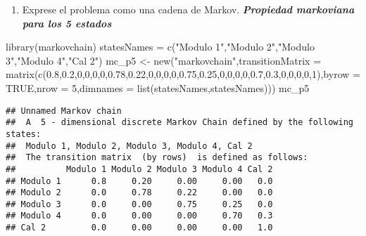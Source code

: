 \documentclass[
]{article}
\newenvironment{Shaded}{\begin{snugshade}}{\end{snugshade}}
\newcommand{\AttributeTok}[1]{\textcolor[rgb]{0.77,0.63,0.00}{#1}}
\newcommand{\ConstantTok}[1]{\textcolor[rgb]{0.00,0.00,0.00}{#1}}
\newcommand{\DecValTok}[1]{\textcolor[rgb]{0.00,0.00,0.81}{#1}}
\newcommand{\FloatTok}[1]{\textcolor[rgb]{0.00,0.00,0.81}{#1}}
\newcommand{\FunctionTok}[1]{\textcolor[rgb]{0.00,0.00,0.00}{#1}}
\newcommand{\NormalTok}[1]{#1}
\newcommand{\OtherTok}[1]{\textcolor[rgb]{0.56,0.35,0.01}{#1}}
\newcommand{\StringTok}[1]{\textcolor[rgb]{0.31,0.60,0.02}{#1}}
\providecommand{\tightlist}{%
  \setlength{\itemsep}{0pt}\setlength{\parskip}{0pt}}
\begin{document}
\begin{enumerate}
\def\labelenumi{\alph{enumi})}
\tightlist
\item
  Exprese el problema como una cadena de Markov. \textbf{\emph{Propiedad
  markoviana para los 5 estados }}
\end{enumerate}

\begin{Shaded}
\begin{Highlighting}[]
\FunctionTok{library}\NormalTok{(markovchain)}
\NormalTok{statesNames }\OtherTok{=} \FunctionTok{c}\NormalTok{(}\StringTok{"Modulo 1"}\NormalTok{,}\StringTok{"Modulo 2"}\NormalTok{,}\StringTok{"Modulo 3"}\NormalTok{,}\StringTok{"Modulo 4"}\NormalTok{,}\StringTok{"Cal 2"}\NormalTok{)}
\NormalTok{mc\_p5 }\OtherTok{\textless{}{-}} \FunctionTok{new}\NormalTok{(}\StringTok{"markovchain"}\NormalTok{,}\AttributeTok{transitionMatrix =} \FunctionTok{matrix}\NormalTok{(}\FunctionTok{c}\NormalTok{(}\FloatTok{0.8}\NormalTok{,}\FloatTok{0.2}\NormalTok{,}\DecValTok{0}\NormalTok{,}\DecValTok{0}\NormalTok{,}\DecValTok{0}\NormalTok{,}\DecValTok{0}\NormalTok{,}\FloatTok{0.78}\NormalTok{,}\FloatTok{0.22}\NormalTok{,}\DecValTok{0}\NormalTok{,}\DecValTok{0}\NormalTok{,}\DecValTok{0}\NormalTok{,}\DecValTok{0}\NormalTok{,}\FloatTok{0.75}\NormalTok{,}\FloatTok{0.25}\NormalTok{,}\DecValTok{0}\NormalTok{,}\DecValTok{0}\NormalTok{,}\DecValTok{0}\NormalTok{,}\DecValTok{0}\NormalTok{,}\FloatTok{0.7}\NormalTok{,}\FloatTok{0.3}\NormalTok{,}\DecValTok{0}\NormalTok{,}\DecValTok{0}\NormalTok{,}\DecValTok{0}\NormalTok{,}\DecValTok{0}\NormalTok{,}\DecValTok{1}\NormalTok{),}\AttributeTok{byrow =} \ConstantTok{TRUE}\NormalTok{,}\AttributeTok{nrow =} \DecValTok{5}\NormalTok{,}\AttributeTok{dimnames =} \FunctionTok{list}\NormalTok{(statesNames,statesNames)))}
\NormalTok{mc\_p5}
\end{Highlighting}
\end{Shaded}

\begin{verbatim}
## Unnamed Markov chain 
##  A  5 - dimensional discrete Markov Chain defined by the following states: 
##  Modulo 1, Modulo 2, Modulo 3, Modulo 4, Cal 2 
##  The transition matrix  (by rows)  is defined as follows: 
##          Modulo 1 Modulo 2 Modulo 3 Modulo 4 Cal 2
## Modulo 1      0.8     0.20     0.00     0.00   0.0
## Modulo 2      0.0     0.78     0.22     0.00   0.0
## Modulo 3      0.0     0.00     0.75     0.25   0.0
## Modulo 4      0.0     0.00     0.00     0.70   0.3
## Cal 2         0.0     0.00     0.00     0.00   1.0
\end{verbatim}
\end{document}
